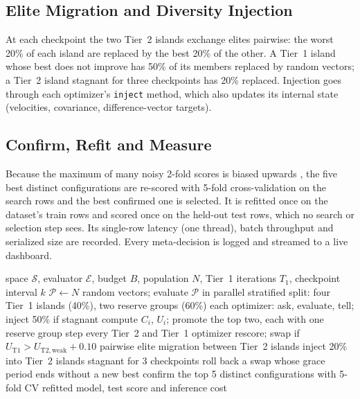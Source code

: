 \documentclass[conference]{IEEEtran}
\begin{document}
\subsection{Elite Migration and Diversity Injection}
At each checkpoint the two Tier~2 islands exchange elites pairwise: the worst 20\% of each island are replaced by the best 20\% of the other. A Tier~1 island whose best does not improve has 50\% of its members replaced by random vectors; a Tier~2 island stagnant for three checkpoints has 20\% replaced. Injection goes through each optimizer's \texttt{inject} method, which also updates its internal state (velocities, covariance, difference-vector targets).

\subsection{Confirm, Refit and Measure}
Because the maximum of many noisy 2-fold scores is biased upwards \cite{schneider2025overtuning}, the five best distinct configurations are re-scored with 5-fold cross-validation on the search rows and the best confirmed one is selected. It is refitted once on the dataset's train rows and scored once on the held-out test rows, which no search or selection step sees. Its single-row latency (one thread), batch throughput and serialized size are recorded. Every meta-decision is logged and streamed to a live dashboard.

\begin{algorithm}[t]
\caption{EvoSynth}
\label{alg:evosynth}
\begin{algorithmic}[1]
\REQUIRE space $\mathcal{S}$, evaluator $\mathcal{E}$, budget $B$, population $N$, Tier~1 iterations $T_1$, checkpoint interval $k$
\STATE $\mathcal{P} \leftarrow N$ random vectors; evaluate $\mathcal{P}$ in parallel
\STATE stratified split: four Tier~1 islands (40\%), two reserve groups (60\%)
    \STATE each optimizer: ask, evaluate, tell; inject 50\% if stagnant
\ENDFOR
\STATE compute $C_i$, $U_i$; promote the top two, each with one reserve group
    \STATE step every Tier~2 and Tier~1 optimizer
        \STATE rescore; swap if $U_{\mathrm{T1}} > U_{\mathrm{T2,weak}} + 0.10$
        \STATE pairwise elite migration between Tier~2 islands
        \STATE inject 20\% into Tier~2 islands stagnant for 3 checkpoints
    \ENDIF
    \STATE roll back a swap whose grace period ends without a new best
\ENDWHILE
\STATE confirm the top 5 distinct configurations with 5-fold CV
\RETURN refitted model, test score and inference cost
\end{algorithmic}
\end{algorithm}
\end{document}
